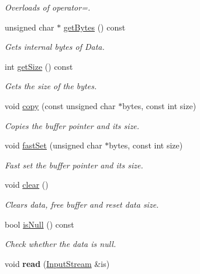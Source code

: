 \begin{DoxyCompactItemize}
\begin{DoxyCompactList}\small\item\em Overloads of operator=. \end{DoxyCompactList}\item 
unsigned char $\ast$ \hyperlink{class_i_dream_sky_1_1_variant_aa54ee325ed9b208770be8bbea7887935}{get\+Bytes} () const 
\begin{DoxyCompactList}\small\item\em Gets internal bytes of Data. \end{DoxyCompactList}\item 
int \hyperlink{class_i_dream_sky_1_1_variant_a6aca08f7d685c286d963b60a0ede8cb3}{get\+Size} () const 
\begin{DoxyCompactList}\small\item\em Gets the size of the bytes. \end{DoxyCompactList}\item 
void \hyperlink{class_i_dream_sky_1_1_variant_a442002c53f624632701be845b5fe749f}{copy} (const unsigned char $\ast$bytes, const int size)
\begin{DoxyCompactList}\small\item\em Copies the buffer pointer and its size. \end{DoxyCompactList}\item 
void \hyperlink{class_i_dream_sky_1_1_variant_ab2ce941c339d77c820de611468a09c45}{fast\+Set} (unsigned char $\ast$bytes, const int size)
\begin{DoxyCompactList}\small\item\em Fast set the buffer pointer and its size. \end{DoxyCompactList}\item 
void \hyperlink{class_i_dream_sky_1_1_variant_a73a88f05fea69f360cbae2dd211fd135}{clear} ()\hypertarget{class_i_dream_sky_1_1_variant_a73a88f05fea69f360cbae2dd211fd135}{}\label{class_i_dream_sky_1_1_variant_a73a88f05fea69f360cbae2dd211fd135}

\begin{DoxyCompactList}\small\item\em Clears data, free buffer and reset data size. \end{DoxyCompactList}\item 
bool \hyperlink{class_i_dream_sky_1_1_variant_ae314c16b2fbe9800d0593ce5dc01b760}{is\+Null} () const 
\begin{DoxyCompactList}\small\item\em Check whether the data is null. \end{DoxyCompactList}\item 
void {\bfseries read} (\hyperlink{class_i_dream_sky_1_1_input_stream}{Input\+Stream} \&is)\hypertarget{class_i_dream_sky_1_1_variant_aef2b0f42210ecd3082a64c2b3d248e04}{}\label{class_i_dream_sky_1_1_variant_aef2b0f42210ecd3082a64c2b3d248e04}


\end{DoxyCompactItemize}
